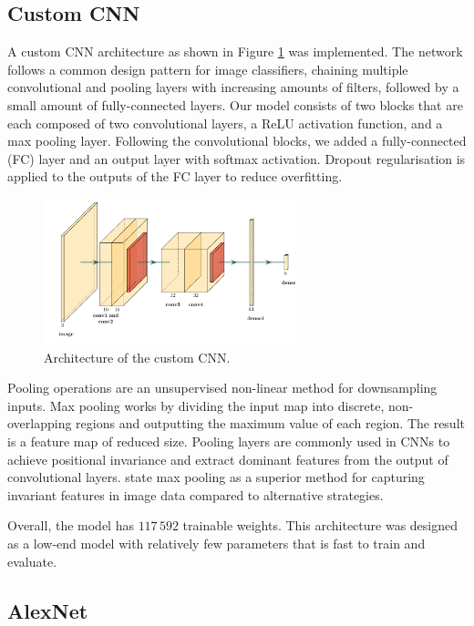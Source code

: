 \documentclass{l4proj}
\begin{document}
\subsection{Custom CNN}
\label{custom_cnn}

A custom CNN architecture as shown in Figure \ref{fig:customnet} was implemented. The network follows a common design pattern for image classifiers, chaining multiple convolutional and pooling layers with increasing amounts of filters, followed by a small amount of fully-connected layers. Our model consists of two blocks that are each composed of two convolutional layers, a ReLU activation function, and a max pooling layer. Following the convolutional blocks, we added a fully-connected (FC) layer and an output layer with softmax activation. Dropout regularisation is applied to the outputs of the FC layer to reduce overfitting.

\begin{figure}[ht]
  \centering
  \includegraphics[width=0.65\textwidth]{images/models/customnet}
  \caption{Architecture of the custom CNN.}
  \label{fig:customnet}
\end{figure}

Pooling operations are an unsupervised non-linear method for downsampling inputs. Max pooling works by dividing the input map into discrete, non-overlapping regions and outputting the maximum value of each region. The result is a feature map of reduced size. Pooling layers are commonly used in CNNs to achieve positional invariance and extract dominant features from the output of convolutional layers. \citet{scherer_evaluation_2010} state max pooling as a superior method for capturing invariant features in image data compared to alternative strategies.

Overall, the model has $117\,592$ trainable weights. This architecture was designed as a low-end model with relatively few parameters that is fast to train and evaluate.

\subsection{AlexNet}
\label{alexnet}
\end{document}
